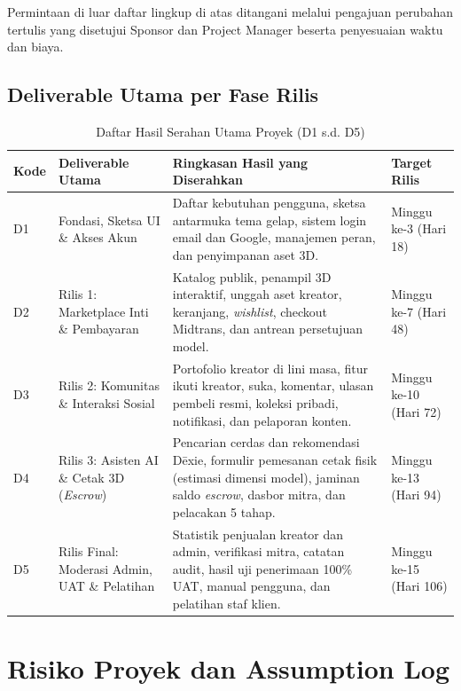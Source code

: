 \documentclass[11pt,a4paper]{article}
\newcommand{\thdr}[1]{\centering\arraybackslash\textbf{#1}}
\begin{document}
Permintaan di luar daftar lingkup di atas ditangani melalui pengajuan perubahan tertulis yang disetujui Sponsor dan Project Manager beserta penyesuaian waktu dan biaya.

\subsection{Deliverable Utama per Fase Rilis}

\begin{table}[H]
\centering
\caption{Daftar Hasil Serahan Utama Proyek (D1 s.d. D5)}
\begin{tabularx}{\textwidth}{| C{1.2cm} | L{4.5cm} | Y | C{2.3cm} |}
\hline
{} \thdr{Kode} & \thdr{Deliverable Utama} & \thdr{Ringkasan Hasil yang Diserahkan} & \thdr{Target Rilis} \\
\hline
D1 & Fondasi, Sketsa UI \& Akses Akun & Daftar kebutuhan pengguna, sketsa antarmuka tema gelap, sistem login email dan Google, manajemen peran, dan penyimpanan aset 3D. & Minggu ke-3 (Hari 18) \\
\hline
D2 & Rilis 1: Marketplace Inti \& Pembayaran & Katalog publik, penampil 3D interaktif, unggah aset kreator, keranjang, \textit{wishlist}, checkout Midtrans, dan antrean persetujuan model. & Minggu ke-7 (Hari 48) \\
\hline
D3 & Rilis 2: Komunitas \& Interaksi Sosial & Portofolio kreator di lini masa, fitur ikuti kreator, suka, komentar, ulasan pembeli resmi, koleksi pribadi, notifikasi, dan pelaporan konten. & Minggu ke-10 (Hari 72) \\
\hline
D4 & Rilis 3: Asisten AI \& Cetak 3D (\textit{Escrow}) & Pencarian cerdas dan rekomendasi D\={e}xie, formulir pemesanan cetak fisik (estimasi dimensi model), jaminan saldo \textit{escrow}, dasbor mitra, dan pelacakan 5 tahap. & Minggu ke-13 (Hari 94) \\
\hline
D5 & Rilis Final: Moderasi Admin, UAT \& Pelatihan & Statistik penjualan kreator dan admin, verifikasi mitra, catatan audit, hasil uji penerimaan 100\% UAT, manual pengguna, dan pelatihan staf klien. & Minggu ke-15 (Hari 106) \\
\hline
\end{tabularx}
\end{table}

\clearpage
\section{Risiko Proyek dan Assumption Log}
\end{document}
